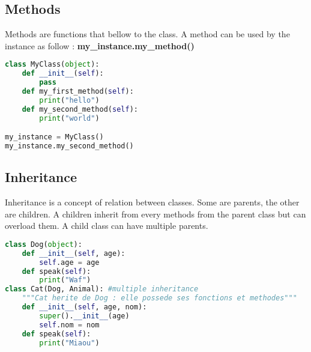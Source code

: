 \documentclass[a4paper, 12pt, titlepage]{scrartcl} %
\begin{document}
\subsection{Methods}
Methods are functions that bellow to the class. A method can be used by the instance as follow  : \textbf{my\_instance.my\_method()}
\begin{lstlisting}[language=Python]
class MyClass(object):
	def __init__(self):
		pass
	def my_first_method(self):
	    print("hello")
	def my_second_method(self):
	    print("world")

my_instance = MyClass()
my_instance.my_second_method()
\end{lstlisting}

\subsection{Inheritance}
Inheritance is a concept of relation between classes. Some are parents, the other are children. A children inherit from every methods from the parent class but can overload them. A child class can have multiple parents.
\begin{lstlisting}[language=Python]
class Dog(object):
	def __init__(self, age):
		self.age = age
	def speak(self):
		print("Waf")
class Cat(Dog, Animal): #multiple inheritance
	"""Cat herite de Dog : elle possede ses fonctions et methodes"""
	def __init__(self, age, nom):
		super().__init__(age)
		self.nom = nom
	def speak(self):
		print("Miaou")
\end{lstlisting}
\end{document}
